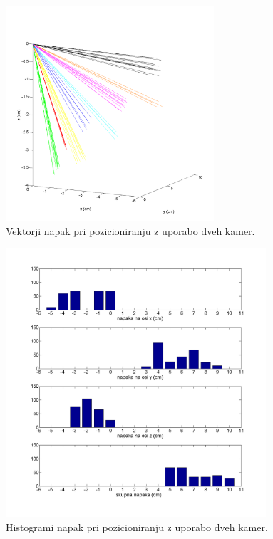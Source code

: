 \documentclass[a4paper, 12pt]{book}
\begin{document}
\begin{figure}
\centering
\includegraphics[height=8cm]{points2errplot.png}
\caption{Vektorji napak pri pozicioniranju z uporabo dveh kamer.}
\label{vec2}
\end{figure}
\begin{figure}
\centering
\includegraphics[height=10cm]{points2barplot.png}
\caption{Histogrami napak pri pozicioniranju z uporabo dveh kamer.}
\label{bar2}
\end{figure}
\end{document}
